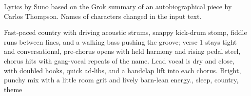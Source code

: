 

\begin{notes}
Lyrics by Suno based on the Grok summary of an autobiographical piece by Carlos Thompson. %
Names of characters changed in the input text.
\end{notes}

\begin{style}
Fast-paced country with driving acoustic strums, snappy kick-drum stomp, fiddle runs between lines, and a walking bass pushing the groove; verse 1 stays tight and conversational, pre-chorus opens with held harmony and rising pedal steel, chorus hits with gang-vocal repeats of the name. %
Lead vocal is dry and close, with doubled hooks, quick ad-libs, and a handclap lift into each chorus. %
Bright, punchy mix with a little room grit and lively barn-lean energy., sleep, country, theme
\end{style}

